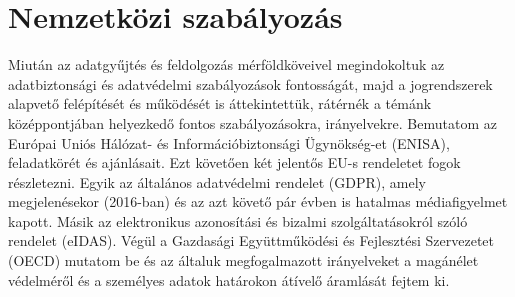 \chapter{Nemzetközi szabályozás}

Miután az adatgyűjtés és feldolgozás mérföldköveivel megindokoltuk az adatbiztonsági és adatvédelmi szabályozások fontosságát, majd a jogrendszerek alapvető felépítését és működését is áttekintettük, rátérnék a témánk középpontjában helyezkedő fontos szabályozásokra, irányelvekre. Bemutatom az Európai Uniós Hálózat- és Információbiztonsági Ügynökség-et (ENISA), feladatkörét és ajánlásait. Ezt követően két jelentős EU-s rendeletet fogok részletezni. Egyik az általános adatvédelmi rendelet (GDPR), amely megjelenésekor (2016-ban) és az azt követő pár évben is hatalmas médiafigyelmet kapott. Másik az elektronikus azonosítási és bizalmi szolgáltatásokról szóló rendelet (eIDAS). Végül a Gazdasági Együttműködési és Fejlesztési Szervezetet (OECD) mutatom be és az általuk megfogalmazott irányelveket a magánélet védelméről és a személyes adatok határokon átívelő áramlását fejtem ki.




